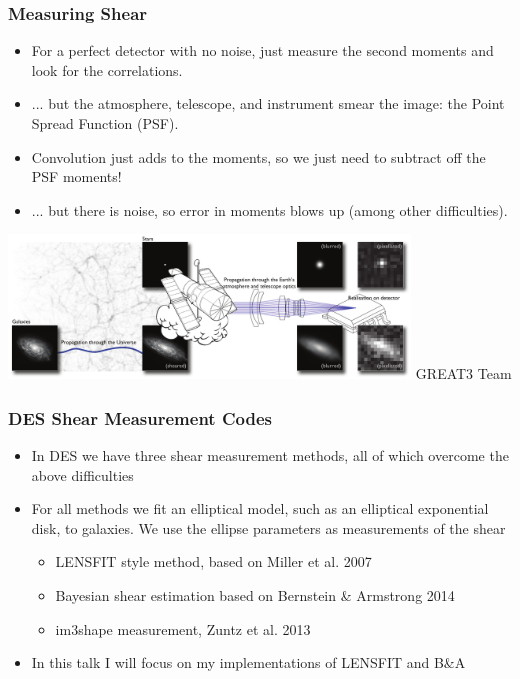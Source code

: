 \documentclass{beamer}
\begin{document}
\frame
{
    \frametitle{Measuring Shear}

    \begin{itemize}

        \item For a perfect detector with no noise, just measure
            the second moments and look for the correlations.

        \item ... but the atmosphere, telescope, and instrument smear
            the image: the Point Spread Function (PSF).

        \item Convolution just adds to the moments, so we just need to
            subtract off the PSF moments!

        \item ... but there is noise, so error in moments blows up (among other
            difficulties).

    \end{itemize}

    \begin{center}
        \includegraphics[width=0.8\textwidth]{great3-systematics.pdf}
        \newline
        GREAT3 Team
    \end{center}

}

\frame
{
    \frametitle{DES Shear Measurement Codes}

    \begin{itemize}

        \item In DES we have three shear measurement methods, all of which
            overcome the above difficulties

        \item For all methods we fit an elliptical model, such as an elliptical
            exponential disk, to galaxies.  We use the ellipse parameters as
            measurements of the shear

        \begin{itemize}
            \item LENSFIT style method, based on Miller et al. 2007

            \item Bayesian shear estimation based on Bernstein \& Armstrong 2014

            \item im3shape measurement, Zuntz et al. 2013
        \end{itemize}

        \item In this talk I will focus on my implementations of
            LENSFIT and B\&A

    \end{itemize}
}
\end{document}
